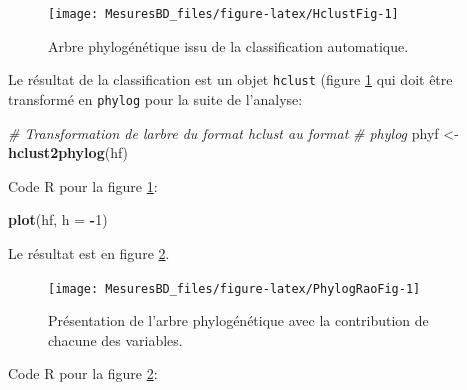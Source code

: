 \documentclass[
  11pt,
  french,
  a4paper,
  extrafontsizes,onecolumn,openright
  ]{memoir}
\newenvironment{Shaded}{\begin{snugshade}}{\end{snugshade}}
\newcommand{\AttributeTok}[1]{\textcolor[rgb]{0.13,0.29,0.53}{#1}}
\newcommand{\CommentTok}[1]{\textcolor[rgb]{0.56,0.35,0.01}{\textit{#1}}}
\newcommand{\DecValTok}[1]{\textcolor[rgb]{0.00,0.00,0.81}{#1}}
\newcommand{\FunctionTok}[1]{\textcolor[rgb]{0.13,0.29,0.53}{\textbf{#1}}}
\newcommand{\NormalTok}[1]{#1}
\newcommand{\OtherTok}[1]{\textcolor[rgb]{0.56,0.35,0.01}{#1}}
\newcommand{\SpecialCharTok}[1]{\textcolor[rgb]{0.81,0.36,0.00}{\textbf{#1}}}
\begin{document}
\begin{figure}

{\centering \texttt{[image: MesuresBD\_files/figure-latex/HclustFig-1]} 

}

\caption{Arbre phylogénétique issu de la classification automatique.}\label{fig:HclustFig}
\end{figure}

\normalsize

Le résultat de la classification est un objet \texttt{hclust} (figure \ref{fig:HclustFig} qui doit être transformé en \texttt{phylog} pour la suite de l'analyse:

\scriptsize

\begin{Shaded}
\begin{Highlighting}[]
\CommentTok{\# Transformation de l\textquotesingle{}arbre du format hclust au format}
\CommentTok{\# phylog}
\NormalTok{phyf }\OtherTok{\textless{}{-}} \FunctionTok{hclust2phylog}\NormalTok{(hf)}
\end{Highlighting}
\end{Shaded}

\normalsize

Code R pour la figure \ref{fig:HclustFig}:

\scriptsize

\begin{Shaded}
\begin{Highlighting}[]
\FunctionTok{plot}\NormalTok{(hf, }\AttributeTok{h =} \SpecialCharTok{{-}}\DecValTok{1}\NormalTok{)}
\end{Highlighting}
\end{Shaded}

\normalsize

Le résultat est en figure \ref{fig:PhylogRaoFig}.



\scriptsize

\begin{figure}

{\centering \texttt{[image: MesuresBD\_files/figure-latex/PhylogRaoFig-1]} 

}

\caption{Présentation de l'arbre phylogénétique avec la contribution de chacune des variables.}\label{fig:PhylogRaoFig}
\end{figure}

\normalsize

Code R pour la figure \ref{fig:PhylogRaoFig}:
\end{document}
